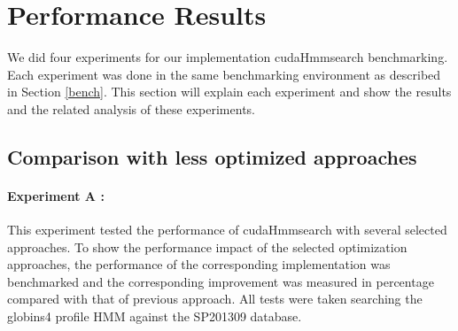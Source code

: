 
\section{Performance Results}
We did four experiments for our implementation cudaHmmsearch benchmarking. Each experiment was done in the same benchmarking environment as described in Section \ref{bench}. This section will explain each experiment and show the results and the related analysis of these experiments.

\subsection{Comparison with less optimized approaches}

\paragraph*{Experiment A : }This experiment tested the performance of cudaHmmsearch with several selected approaches. To show the performance impact of the selected optimization approaches, the performance of the corresponding implementation was benchmarked and the corresponding improvement was measured in percentage compared with that of previous approach.
All tests were taken searching the globins4 profile HMM against the SP201309 database.

